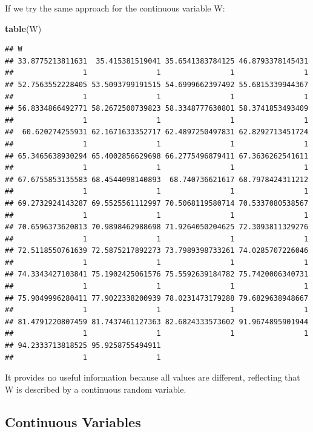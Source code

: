 \documentclass[
]{article}
\newenvironment{Shaded}{\begin{snugshade}}{\end{snugshade}}
\newcommand{\FunctionTok}[1]{\textcolor[rgb]{0.13,0.29,0.53}{\textbf{#1}}}
\newcommand{\NormalTok}[1]{#1}
\begin{document}
If we try the same approach for the continuous variable W:

\begin{Shaded}
\begin{Highlighting}[]
\FunctionTok{table}\NormalTok{(W)}
\end{Highlighting}
\end{Shaded}

\begin{verbatim}
## W
## 33.8775213811631  35.415381519041 35.6541383784125 46.8793378145431 
##                1                1                1                1 
## 52.7563552228405 53.5093799191515 54.6999662397492 55.6815339944367 
##                1                1                1                1 
## 56.8334866492771 58.2672500739823 58.3348777630801 58.3741853493409 
##                1                1                1                1 
##  60.620274255931 62.1671633352717 62.4897250497831 62.8292713451724 
##                1                1                1                1 
## 65.3465638930294 65.4002856629698 66.2775496879411 67.3636262541611 
##                1                1                1                1 
## 67.6755853135583 68.4544098140893  68.740736621617 68.7978424311212 
##                1                1                1                1 
## 69.2732924143287 69.5525561112997 70.5068119580714 70.5337080538567 
##                1                1                1                1 
## 70.6596373620813 70.9898462988698 71.9264050204625 72.3093811329276 
##                1                1                1                1 
## 72.5118550761639 72.5875217892273 73.7989398733261 74.0285707226046 
##                1                1                1                1 
## 74.3343427103841 75.1902425061576 75.5592639184782 75.7420006340731 
##                1                1                1                1 
## 75.9049996280411 77.9022338200939 78.0231473179288 79.6829638948667 
##                1                1                1                1 
## 81.4791220807459 81.7437461127363 82.6824333573602 91.9674895901944 
##                1                1                1                1 
## 94.2333713818525 95.9258755494911 
##                1                1
\end{verbatim}

It provides no useful information because all values are different,
reflecting that W is described by a continuous random variable.

\hypertarget{continuous-variables}{%
\subsection{Continuous Variables}\label{continuous-variables}}
\end{document}
